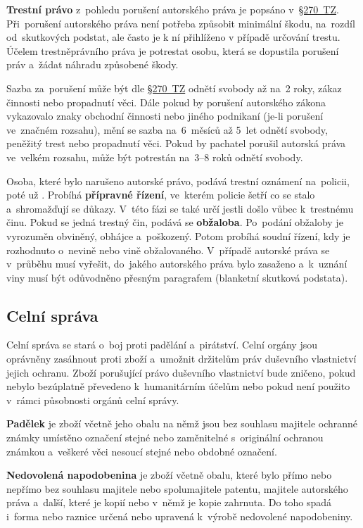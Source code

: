 \textbf{Trestní právo} z~pohledu porušení autorského práva je popsáno v~\href{https://www.zakonyprolidi.cz/cs/2009-40#p270}{§270~TZ}. Při~porušení autorského práva není potřeba způsobit minimální škodu, na~rozdíl od~skutkových podstat, ale často je k ní přihlíženo v případě určování trestu. Účelem trestněprávního práva je potrestat osobu, která se dopustila porušení práv a~žádat náhradu způsobené škody.

Sazba za~porušení může být dle \href{https://www.zakonyprolidi.cz/cs/2009-40#p270}{§270~TZ} odnětí svobody až na~2 roky, zákaz činnosti nebo propadnutí věci. Dále pokud by porušení autorského zákona vykazovalo znaky obchodní činnosti nebo jiného podnikaní (je-li porušení ve~značném rozsahu), mění se sazba na~6~měsíců až 5~let odnětí svobody, peněžitý trest nebo propadnutí věci. Pokud by pachatel porušil autorská práva ve~velkém rozsahu, může být potrestán na~3--8 roků odnětí svobody.

Osoba, které bylo narušeno autorské právo, podává trestní oznámení na~policii, poté už . Probíhá \textbf{přípravné řízení}, ve~kterém policie šetří co se stalo a~shromažďují se důkazy. V~této fázi se také určí jestli došlo vůbec k~trestnému činu. Pokud se jedná trestný čin, podává se \textbf{obžaloba}. Po~podání obžaloby je vyrozuměn obviněný, obhájce a~poškozený. Potom probíhá soudní řízení, kdy je rozhodnuto o~nevině nebo vině obžalovaného. V~případě autorské práva se v~průběhu musí vyřešit, do~jakého autorského práva bylo zasaženo a~k~uznání viny musí být odůvodněno přesným paragrafem (blanketní skutková podstata).

\subsection{Celní správa}

Celní správa se stará o~boj proti padělání a~pirátství. Celní orgány jsou oprávněny zasáhnout proti zboží a~umožnit držitelům práv duševního vlastnictví jejich ochranu. Zboží porušující právo duševního vlastnictví bude zničeno, pokud nebylo bezúplatně převedeno k~humanitárním účelům nebo pokud není použito v~rámci působnosti orgánů celní správy.

\textbf{Padělek} je zboží včetně jeho obalu na němž jsou bez souhlasu majitele ochranné známky umístěno označení stejné nebo zaměnitelné s~originální ochranou známkou a~veškeré věci nesoucí stejné nebo obdobné označení.

\textbf{Nedovolená napodobenina} je zboží včetně obalu, které bylo přímo nebo nepřímo bez souhlasu majitele nebo spolumajitele patentu, majitele autorského práva a~další, které je kopií nebo v~němž je kopie zahrnuta. Do toho spadá i~forma nebo raznice určená nebo upravená k~výrobě nedovolené napodobeniny.

